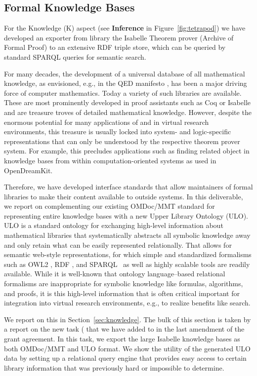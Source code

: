 \subsection{Formal Knowledge Bases}\label{sec:isabelle}
For the Knowledge (K) aspect (see \textbf{Inference} in Figure~\ref{fig:tetrapod}) we have developed an exporter from library the Isabelle Theorem prover (Archive of Formal Proof) to an extensive RDF triple store, which can be queried by standard SPARQL queries for semantic search.
  
For many decades, the development of a universal database of all mathematical knowledge, as envisioned, e.g., in the QED manifesto \cite{qed}, has been a major driving force of computer mathematics.
Today a variety of such libraries are available.
These are most prominently developed in proof assistants such as Coq \cite{coq} or Isabelle \cite{isabelle} and are treasure troves of detailed mathematical knowledge.
However, despite the enormous potential for many applications of and in virtual research environments, this treasure is usually locked into system- and logic-specific representations that can only be understood by the respective theorem prover system.
For example, this precludes applications such as finding related object in knowledge bases from within computation-oriented systems as used in OpenDreamKit.

Therefore, we have developed interface standards that allow maintainers of formal libraries to make their content available to outside systems.
In this deliverable, we report on complementing our existing OMDoc/MMT standard for representing entire knowledge bases with a new Upper Library Ontology (ULO).
ULO is a standard ontology for exchanging high-level information about mathematical libraries that systematically abstracts all symbolic knowledge away and only retain what can be easily represented relationally.
That allows for semantic web-style representations, for which simple and standardized formalisms such as OWL2 \cite{w3c:owl2-xml}, RDF \cite{rdf}, and SPARQL~\cite{w3c:SPARQL-Rec:13} as well as highly scalable tools are readily available.
While it is well-known that ontology language--based relational formalisms are inappropriate for symbolic knowledge like formulas, algorithms, and proofs, it is this high-level information that is often critical important for integration into virtual research environments, e.g., to realize benefits like search.

We report on this in Section~\ref{sec:knowledge}.
The bulk of this section is taken by a report on the new task ( that we have added to \pn in the last amendment of the grant agreement.
In this task, we export the large Isabelle knowledge bases  as both OMDoc/MMT and ULO format.
We show the utility of the generated ULO data by setting up a relational query engine that provides easy access to certain library information that was previously hard or impossible to determine.

